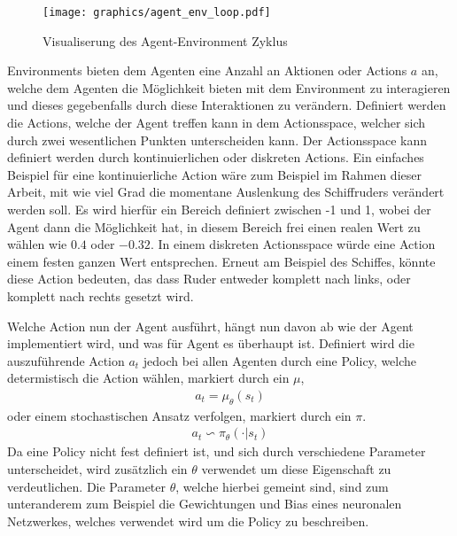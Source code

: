 \documentclass[]{iat}
\begin{document}
\begin{figure}[H]
    \texttt{[image: graphics/agent\_env\_loop.pdf]}
    \centering
    \caption{Visualiserung des Agent-Environment Zyklus}
    \label{abb:agent_env_loop}
\end{figure}

Environments bieten dem Agenten eine Anzahl an Aktionen oder Actions $a$ an, welche dem Agenten die Möglichkeit bieten mit dem Environment zu interagieren und dieses gegebenfalls durch diese Interaktionen zu verändern. Definiert werden die Actions, welche der Agent treffen kann in dem Actionsspace, welcher sich durch zwei wesentlichen Punkten unterscheiden kann. Der Actionsspace kann definiert werden durch kontinuierlichen oder diskreten Actions. Ein einfaches Beispiel für eine kontinuierliche Action wäre zum Beispiel im Rahmen dieser Arbeit, mit wie viel Grad die momentane Auslenkung des Schiffruders verändert werden soll. Es wird hierfür ein Bereich definiert zwischen -1 und 1, wobei der Agent dann die Möglichkeit hat, in diesem Bereich frei einen realen Wert zu wählen wie $0.4$ oder $-0.32$. In einem diskreten Actionsspace würde eine Action einem festen ganzen Wert entsprechen. Erneut am Beispiel des Schiffes, könnte diese Action bedeuten, das dass Ruder entweder komplett nach links, oder komplett nach rechts gesetzt wird.

Welche Action nun der Agent ausführt, hängt nun davon ab wie der Agent implementiert wird, und was für Agent es überhaupt ist. Definiert wird die auszuführende Action $a_t$ jedoch bei allen Agenten durch eine Policy, welche determistisch die Action wählen, markiert durch ein $\mu$,
\begin{align}
    a_t = \mu_\theta(s_t)
\end{align}
oder einem stochastischen Ansatz verfolgen, markiert durch ein $\pi$.
\begin{align}
    a_t \backsim \pi_\theta (\cdot | s_t)
\end{align}
Da eine Policy nicht fest definiert ist, und sich durch verschiedene Parameter unterscheidet, wird zusätzlich ein $\theta$ verwendet um diese Eigenschaft zu verdeutlichen. Die Parameter $\theta$, welche hierbei gemeint sind, sind zum unteranderem zum Beispiel die Gewichtungen und Bias eines neuronalen Netzwerkes, welches verwendet wird um die Policy zu beschreiben.
\end{document}
